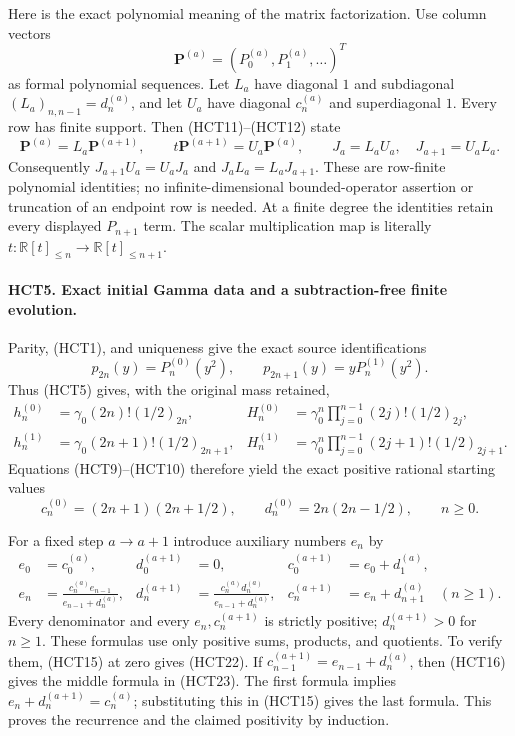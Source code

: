 \documentclass[11pt,a4paper]{article}
\begin{document}
Here is the exact polynomial meaning of the matrix factorization.
Use column vectors
\[\mathbf P^{(a)}=(P_0^{(a)},P_1^{(a)},\ldots)^T\]
as formal polynomial sequences. Let $L_a$ have diagonal $1$ and
subdiagonal $(L_a)_{n,n-1}=d_n^{(a)}$, and let $U_a$ have diagonal
$c_n^{(a)}$ and superdiagonal $1$. Every row has finite support.
Then (HCT11)--(HCT12) state
\begin{equation}\tag{HCT17}
 \mathbf P^{(a)}=L_a\mathbf P^{(a+1)},\qquad
 t\mathbf P^{(a+1)}=U_a\mathbf P^{(a)},\qquad
 J_a=L_aU_a,\quad J_{a+1}=U_aL_a.
\end{equation}
Consequently $J_{a+1}U_a=U_aJ_a$ and $J_aL_a=L_aJ_{a+1}$.
These are row-finite polynomial identities; no infinite-dimensional
bounded-operator assertion or truncation of an endpoint row is
needed. At a finite degree the identities retain every displayed
$P_{n+1}$ term. The scalar multiplication map is literally
$t:\mathbb R[t]_{\leq n}\to\mathbb R[t]_{\leq n+1}$.

\paragraph{HCT5. Exact initial Gamma data and a subtraction-free finite evolution.}
Parity, (HCT1), and uniqueness give the exact source identifications
\begin{equation}\tag{HCT18}
 p_{2n}(y)=P_n^{(0)}(y^2),\qquad
 p_{2n+1}(y)=yP_n^{(1)}(y^2).
\end{equation}
Thus (HCT5) gives, with the original mass retained,
\begin{align}
 h_n^{(0)}&=\gamma_0(2n)!(1/2)_{2n},&
 H_n^{(0)}&=\gamma_0^n\prod_{j=0}^{n-1}(2j)!(1/2)_{2j},\tag{HCT19}\\
 h_n^{(1)}&=\gamma_0(2n+1)!(1/2)_{2n+1},&
 H_n^{(1)}&=\gamma_0^n\prod_{j=0}^{n-1}(2j+1)!(1/2)_{2j+1}.\tag{HCT20}
\end{align}
Equations (HCT9)--(HCT10) therefore yield the exact positive
rational starting values
\begin{equation}\tag{HCT21}
 c_n^{(0)}=(2n+1)(2n+1/2),\qquad
 d_n^{(0)}=2n(2n-1/2),\qquad n\geq0.
\end{equation}

For a fixed step $a\to a+1$ introduce auxiliary numbers $e_n$ by
\begin{align}
 e_0&=c_0^{(a)},&d_0^{(a+1)}&=0,&
 c_0^{(a+1)}&=e_0+d_1^{(a)},\tag{HCT22}\\
 e_n&=\frac{c_n^{(a)}e_{n-1}}{e_{n-1}+d_n^{(a)}},&
 d_n^{(a+1)}&=\frac{c_n^{(a)}d_n^{(a)}}{e_{n-1}+d_n^{(a)}},&
 c_n^{(a+1)}&=e_n+d_{n+1}^{(a)}\quad(n\geq1).\tag{HCT23}
\end{align}
Every denominator and every $e_n,c_n^{(a+1)}$ is strictly positive;
$d_n^{(a+1)}>0$ for $n\geq1$. These formulas use only positive
sums, products, and quotients. To verify them, (HCT15) at zero
gives (HCT22). If $c_{n-1}^{(a+1)}=e_{n-1}+d_n^{(a)}$, then
(HCT16) gives the middle formula in (HCT23). The first formula
implies $e_n+d_n^{(a+1)}=c_n^{(a)}$; substituting this in
(HCT15) gives the last formula. This proves the recurrence and
the claimed positivity by induction.
\end{document}
